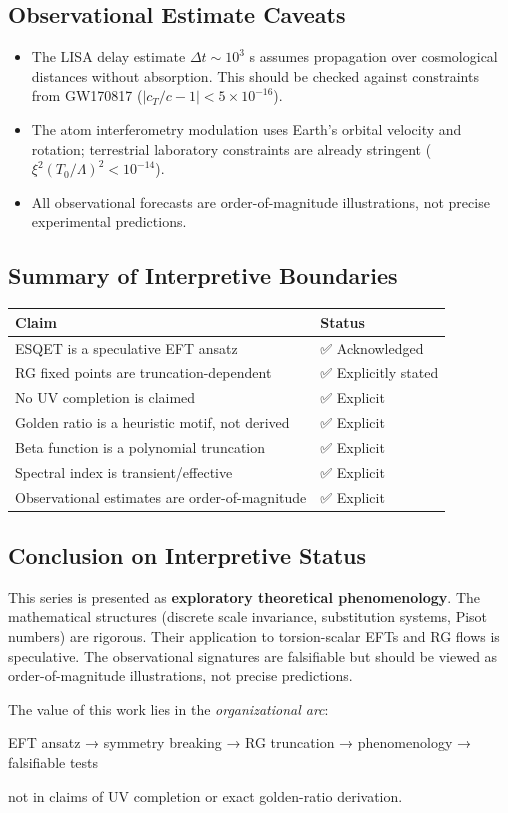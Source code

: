 \subsection*{Observational Estimate Caveats}
\begin{itemize}
    \item The LISA delay estimate $\Delta t \sim 10^3$ s assumes propagation over cosmological distances without absorption. This should be checked against constraints from GW170817 ($|c_T/c - 1| < 5\times10^{-16}$).
    \item The atom interferometry modulation uses Earth's orbital velocity and rotation; terrestrial laboratory constraints are already stringent ($\xi^2 (T_0/\Lambda)^2 < 10^{-14}$).
    \item All observational forecasts are order-of-magnitude illustrations, not precise experimental predictions.
\end{itemize}

\subsection*{Summary of Interpretive Boundaries}
\begin{tabular}{|p{}|p{}|}
\hline
\textbf{Claim} & \textbf{Status} \\
\hline
ESQET is a speculative EFT ansatz & ✅ Acknowledged \\
\hline
RG fixed points are truncation-dependent & ✅ Explicitly stated \\
\hline
No UV completion is claimed & ✅ Explicit \\
\hline
Golden ratio is a heuristic motif, not derived & ✅ Explicit \\
\hline
Beta function is a polynomial truncation & ✅ Explicit \\
\hline
Spectral index is transient/effective & ✅ Explicit \\
\hline
Observational estimates are order-of-magnitude & ✅ Explicit \\
\hline
\end{tabular}

\subsection*{Conclusion on Interpretive Status}
This series is presented as \textbf{exploratory theoretical phenomenology}. The mathematical structures (discrete scale invariance, substitution systems, Pisot numbers) are rigorous. Their application to torsion-scalar EFTs and RG flows is speculative. The observational signatures are falsifiable but should be viewed as order-of-magnitude illustrations, not precise predictions.

The value of this work lies in the \textit{organizational arc}:
\begin{center}
EFT ansatz → symmetry breaking → RG truncation → phenomenology → falsifiable tests
\end{center}
not in claims of UV completion or exact golden-ratio derivation.

